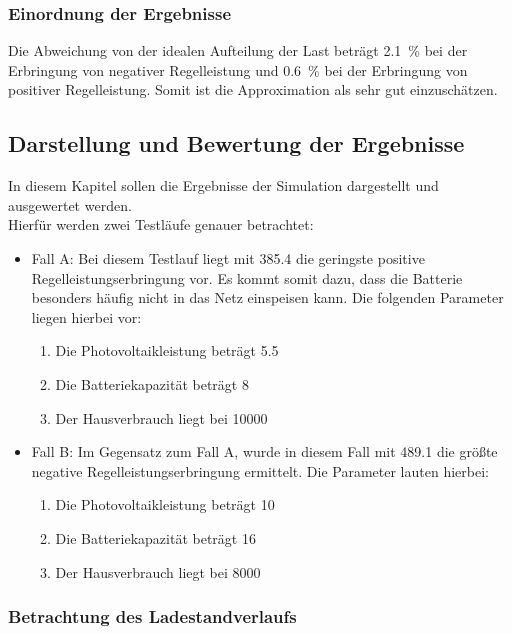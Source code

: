 \subsubsection*{Einordnung der Ergebnisse}

Die Abweichung von der idealen Aufteilung der Last beträgt \SI{2.1}{\percent} bei der Erbringung von negativer Regelleistung und \SI{0.6}{\percent} bei der Erbringung von positiver Regelleistung. Somit ist die Approximation als sehr gut einzuschätzen.

\subsection{Darstellung und Bewertung der Ergebnisse}

In diesem Kapitel sollen die Ergebnisse der Simulation dargestellt und ausgewertet werden.\medskip\\
Hierfür werden zwei Testläufe genauer betrachtet:

\begin{itemize}
	\item Fall A: Bei diesem Testlauf liegt mit \SI{385.4}{\kwh} die geringste positive Regelleistungserbringung vor. Es kommt somit dazu, dass die Batterie besonders häufig nicht in das Netz einspeisen kann. Die folgenden Parameter liegen hierbei vor:
	\begin{enumerate}
	\itemsep-0.5em
		\item Die Photovoltaikleistung beträgt \SI{5.5}{\kwp}
		\item Die Batteriekapazität beträgt \SI{8}{\kwh}
		\item Der Hausverbrauch liegt bei \SI{10000}{\kwh}
	\end{enumerate}
	\item Fall B: Im Gegensatz zum Fall A, wurde in diesem Fall mit \SI{489.1}{\kwh} die größte negative Regelleistungserbringung ermittelt. Die Parameter lauten hierbei:
	\begin{enumerate}
	\itemsep-0.5em
		\item Die Photovoltaikleistung beträgt \SI{10}{\kwp}
		\item Die Batteriekapazität beträgt \SI{16}{\kwh}
		\item Der Hausverbrauch liegt bei \SI{8000}{\kwh}
	\end{enumerate}
\end{itemize}

\subsubsection{Betrachtung des Ladestandverlaufs}

